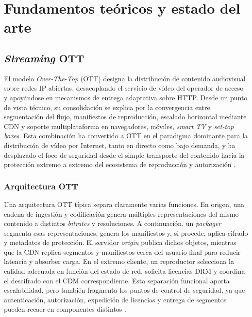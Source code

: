 
\chapter{Fundamentos teóricos y estado del arte}

\section{\textit{Streaming} OTT}

El modelo \textit{Over-The-Top} (OTT) designa la distribución de contenido audiovisual sobre redes IP abiertas, desacoplando el servicio de vídeo del operador de acceso y apoyándose en mecanismos de entrega adaptativa sobre HTTP. Desde un punto de vista técnico, su consolidación se explica por la convergencia entre segmentación del flujo, manifiestos de reproducción, escalado horizontal mediante CDN y soporte multiplataforma en navegadores, móviles, \textit{smart TV} y \textit{set-top boxes}. Esta combinación ha convertido a OTT en el paradigma dominante para la distribución de vídeo por Internet, tanto en directo como bajo demanda, y ha desplazado el foco de seguridad desde el simple transporte del contenido hacia la protección extremo a extremo del ecosistema de reproducción y autorización \cite{iso23009dash2022,dashif-about,rfc8216-hls}.

\subsection{Arquitectura OTT}

Una arquitectura OTT típica separa claramente varias funciones. En origen, una cadena de ingestión y codificación genera múltiples representaciones del mismo contenido a distintos \textit{bitrates} y resoluciones. A continuación, un \textit{packager} segmenta esas representaciones, genera los manifiestos y, si procede, aplica cifrado y metadatos de protección. El servidor \textit{origin} publica dichos objetos, mientras que la CDN replica segmentos y manifiestos cerca del usuario final para reducir latencia y absorber carga. En el extremo cliente, un reproductor selecciona la calidad adecuada en función del estado de red, solicita licencias DRM y coordina el descifrado con el CDM correspondiente. Esta separación funcional aporta escalabilidad, pero también fragmenta los puntos de control de seguridad, ya que autenticación, autorización, expedición de licencias y entrega de segmentos pueden recaer en componentes distintos \cite{shaka-packager-docs,shaka-packager-drm,dashif-about,w3ceme2026}.

